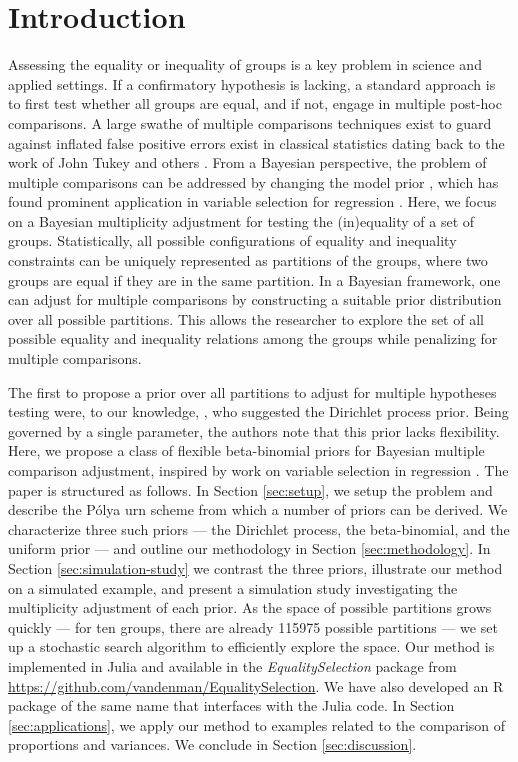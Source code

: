 \documentclass[11pt,a4paper]{article}
\theoremstyle{definition} %
\theoremstyle{case}
\begin{document}
\section{Introduction}
Assessing the equality or inequality of groups is a key problem in science and applied settings. If a confirmatory hypothesis is lacking, a standard approach is to first test whether all groups are equal, and if not, engage in multiple post-hoc comparisons. A large swathe of multiple comparisons techniques exist to guard against inflated false positive errors exist in classical statistics dating back to the work of John Tukey and others \parencite[][]{rao2009multiple, benjamini2002john}. From a Bayesian perspective, the problem of multiple comparisons can be addressed by changing the model prior \parencite[e.g.,][]{jeffreys1961theory, westfall1997bayesian, berry1999bayesian}, which has found prominent application in variable selection for regression \parencite[e.g.,][]{scott2006exploration, scott2010bayes}. Here, we focus on a Bayesian multiplicity adjustment for testing the (in)equality of a set of groups. Statistically, all possible configurations of equality and inequality constraints can be uniquely represented as partitions of the groups, where two groups are equal if they are in the same partition. In a Bayesian framework, one can adjust for multiple comparisons by constructing a suitable prior distribution over all possible partitions. This allows the researcher to explore the set of all possible equality and inequality relations among the groups while penalizing for multiple comparisons.

The first to propose a prior over all partitions to adjust for multiple hypotheses testing were, to our knowledge, \textcite{gopalan1998bayesian}, who suggested the Dirichlet process prior. Being governed by a single parameter, the authors note that this prior lacks flexibility. Here, we propose a class of flexible beta-binomial priors for Bayesian multiple comparison adjustment, inspired by work on variable selection in regression \parencite{scott2006exploration, scott2010bayes}. The paper is structured as follows. In Section \ref{sec:setup}, we setup the problem and describe the P\'{o}lya urn scheme from which a number of priors can be derived. We characterize three such priors --- the Dirichlet process, the beta-binomial, and the uniform prior --- and outline our methodology in Section \ref{sec:methodology}. In Section \ref{sec:simulation-study} we contrast the three priors, illustrate our method on a simulated example, and present a simulation study investigating the multiplicity adjustment of each prior. As the space of possible partitions grows quickly --- for ten groups, there are already 115975 possible partitions --- we set up a stochastic search algorithm to efficiently explore the space. Our method is implemented in Julia and available in the \textit{EqualitySelection} package from \url{https://github.com/vandenman/EqualitySelection}. We have also developed an R package of the same name that interfaces with the Julia code. In Section \ref{sec:applications}, we apply our method to examples related to the comparison of proportions and variances. We conclude in Section \ref{sec:discussion}.
\end{document}
